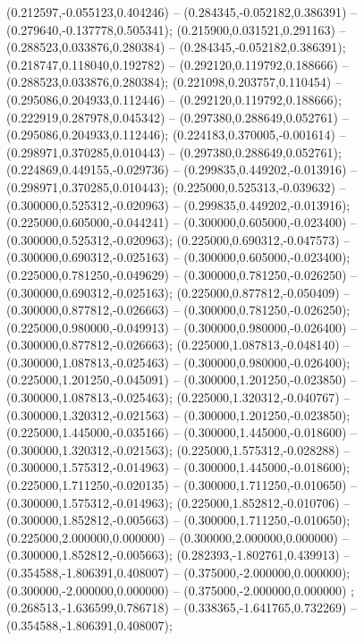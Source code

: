  (0.212597,-0.055123,0.404246) -- (0.284345,-0.052182,0.386391) -- (0.279640,-0.137778,0.505341);
 (0.215900,0.031521,0.291163) -- (0.288523,0.033876,0.280384) -- (0.284345,-0.052182,0.386391);
 (0.218747,0.118040,0.192782) -- (0.292120,0.119792,0.188666) -- (0.288523,0.033876,0.280384);
 (0.221098,0.203757,0.110454) -- (0.295086,0.204933,0.112446) -- (0.292120,0.119792,0.188666);
 (0.222919,0.287978,0.045342) -- (0.297380,0.288649,0.052761) -- (0.295086,0.204933,0.112446);
 (0.224183,0.370005,-0.001614) -- (0.298971,0.370285,0.010443) -- (0.297380,0.288649,0.052761);
 (0.224869,0.449155,-0.029736) -- (0.299835,0.449202,-0.013916) -- (0.298971,0.370285,0.010443);
 (0.225000,0.525313,-0.039632) -- (0.300000,0.525312,-0.020963) -- (0.299835,0.449202,-0.013916);
 (0.225000,0.605000,-0.044241) -- (0.300000,0.605000,-0.023400) -- (0.300000,0.525312,-0.020963);
 (0.225000,0.690312,-0.047573) -- (0.300000,0.690312,-0.025163) -- (0.300000,0.605000,-0.023400);
 (0.225000,0.781250,-0.049629) -- (0.300000,0.781250,-0.026250) -- (0.300000,0.690312,-0.025163);
 (0.225000,0.877812,-0.050409) -- (0.300000,0.877812,-0.026663) -- (0.300000,0.781250,-0.026250);
 (0.225000,0.980000,-0.049913) -- (0.300000,0.980000,-0.026400) -- (0.300000,0.877812,-0.026663);
 (0.225000,1.087813,-0.048140) -- (0.300000,1.087813,-0.025463) -- (0.300000,0.980000,-0.026400);
 (0.225000,1.201250,-0.045091) -- (0.300000,1.201250,-0.023850) -- (0.300000,1.087813,-0.025463);
 (0.225000,1.320312,-0.040767) -- (0.300000,1.320312,-0.021563) -- (0.300000,1.201250,-0.023850);
 (0.225000,1.445000,-0.035166) -- (0.300000,1.445000,-0.018600) -- (0.300000,1.320312,-0.021563);
 (0.225000,1.575312,-0.028288) -- (0.300000,1.575312,-0.014963) -- (0.300000,1.445000,-0.018600);
 (0.225000,1.711250,-0.020135) -- (0.300000,1.711250,-0.010650) -- (0.300000,1.575312,-0.014963);
 (0.225000,1.852812,-0.010706) -- (0.300000,1.852812,-0.005663) -- (0.300000,1.711250,-0.010650);
 (0.225000,2.000000,0.000000) -- (0.300000,2.000000,0.000000) -- (0.300000,1.852812,-0.005663);
 (0.282393,-1.802761,0.439913) -- (0.354588,-1.806391,0.408007) -- (0.375000,-2.000000,0.000000);
 (0.300000,-2.000000,0.000000) -- (0.375000,-2.000000,0.000000) ;
 (0.268513,-1.636599,0.786718) -- (0.338365,-1.641765,0.732269) -- (0.354588,-1.806391,0.408007);
